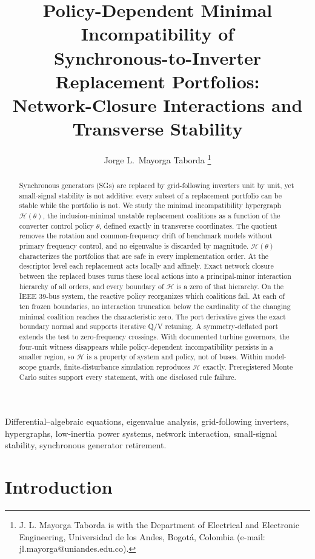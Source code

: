 \documentclass[journal]{IEEEtran}
\title{Policy-Dependent Minimal Incompatibility of\\ Synchronous-to-Inverter
Replacement Portfolios:\\ Network-Closure Interactions and Transverse Stability}
\author{Jorge L.~Mayorga Taborda%
\thanks{J. L. Mayorga Taborda is with the Department of Electrical and
Electronic Engineering, Universidad de los Andes, Bogot\'a, Colombia
(e-mail: jl.mayorga@uniandes.edu.co).}%
}
\theoremstyle{definition}
\theoremstyle{remark}
\newcommand{\Hy}{\mathcal{H}}
\begin{document}
\maketitle

\begin{abstract}
Synchronous generators (SGs) are replaced by grid-following inverters unit by
unit, yet small-signal stability is not additive: every subset of a
replacement portfolio can be stable while the portfolio is not. We study the
minimal incompatibility hypergraph $\Hy(\theta)$, the inclusion-minimal
unstable replacement coalitions as a function of the converter control policy
$\theta$, defined exactly in transverse coordinates. The quotient removes the
rotation and common-frequency drift of benchmark models without primary
frequency control, and no eigenvalue is discarded by magnitude. $\Hy(\theta)$
characterizes the portfolios that are safe in every implementation order. At
the descriptor level each replacement acts locally and affinely. Exact network
closure between the replaced buses turns these local actions into a
principal-minor interaction hierarchy of all orders, and every boundary of
$\Hy$ is a zero of that hierarchy. On the IEEE 39-bus system, the reactive
policy reorganizes which coalitions fail. At each of ten frozen boundaries, no
interaction truncation below the cardinality of the changing minimal coalition
reaches the characteristic zero. The port derivative gives the exact boundary
normal and supports iterative Q/V retuning. A symmetry-deflated port extends
the test to zero-frequency crossings. With documented turbine governors, the
four-unit witness disappears while policy-dependent incompatibility persists in
a smaller region, so $\Hy$ is a property of system and policy, not of buses.
Within model-scope guards, finite-disturbance simulation reproduces $\Hy$
exactly. Preregistered Monte Carlo suites support every statement, with one
disclosed rule failure.
\end{abstract}

\begin{IEEEkeywords}
Differential--algebraic equations, eigenvalue analysis, grid-following
inverters, hypergraphs, low-inertia power systems, network interaction,
small-signal stability, synchronous generator retirement.
\end{IEEEkeywords}

\section{Introduction}
\end{document}
